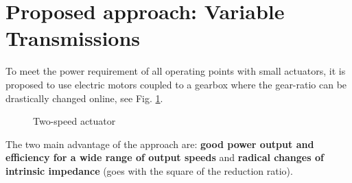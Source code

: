 %




\section{Proposed approach: Variable Transmissions}
\label{sec:ProposedSolutionRobotsUsingMultipleGearRatioActuators}


To meet the power requirement of all operating points with small actuators, it is proposed to use electric motors coupled to a gearbox where the gear-ratio can be drastically changed online, see Fig. \ref{fig:2s}. 

\begin{figure}[htb]
        \centering
        \caption{Two-speed actuator}\label{fig:2s}
\end{figure}


The two main advantage of the approach are: \textbf{good power output and efficiency for a wide range of output speeds} and \textbf{radical changes of intrinsic impedance} (goes with the square of the reduction ratio). 


